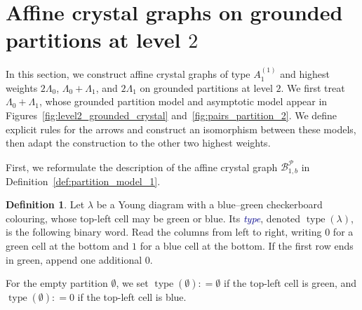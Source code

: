 \documentclass[11pt]{article}
\theoremstyle{definition}
\newtheorem{definition}[theorem]{Definition}
\theoremstyle{remark}
\theoremstyle{definition}
\numberwithin{equation}{section}
\newcommand{\type}{\operatorname{type}}
\newcommand{\coloneq}{\mathrel{\mathop:}=}
\renewcommand\emph[1]{\textcolor{darkblue}{\it #1}}
\begin{document}
\section{Affine crystal graphs on grounded partitions at level \( 2 \)}\label{section:partition_model}

In this section, we construct affine crystal graphs of type \( A_1^{(1)} \) and highest weights \( 2\Lambda_0 \), \( \Lambda_0 + \Lambda_1 \), and \( 2\Lambda_1 \) on grounded partitions at level \( 2 \). We first treat \( \Lambda_0 + \Lambda_1 \), whose grounded partition model and asymptotic model appear in Figures~\ref{fig:level2_grounded_crystal} and~\ref{fig:pairs_partition_2}. We define explicit rules for the arrows and construct an isomorphism between these models, then adapt the construction to the other two highest weights.

First, we reformulate the description of the affine crystal graph \(\mathcal{B}_{1,b}^{\mathcal{P}}\) in Definition~\ref{def:partition_model_1}. 

\begin{definition}\label{def:partition_type}
  Let \( \lambda \) be a Young diagram with a blue--green checkerboard colouring, whose top-left cell may be green or blue. Its \emph{type}, denoted \( \type(\lambda) \), is the following binary word. Read the columns from left to right, writing \( 0 \) for a green cell at the bottom and \( 1 \) for a blue cell at the bottom. If the first row ends in green, append one additional \( 0 \).

  For the empty partition \( \emptyset \), we set
  \( \type(\emptyset) \coloneq \emptyset \) if the top-left cell is green, and
  \( \type(\emptyset) \coloneq 0 \) if the top-left cell is blue.
\end{definition}
\end{document}
